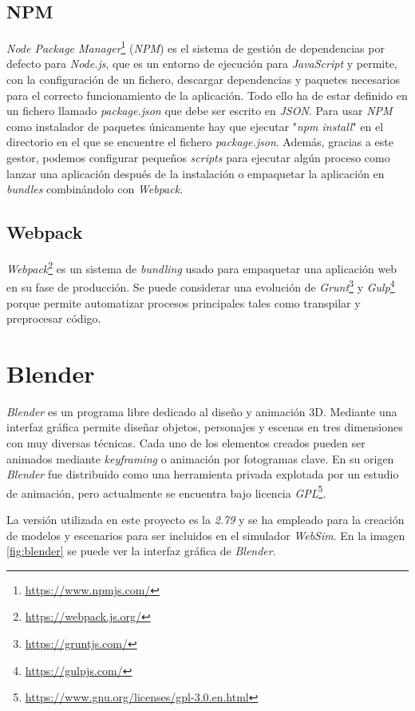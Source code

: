 \subsection{NPM}
\textit{Node Package Manager}\footnote{\url{https://www.npmjs.com/}} (\textit{NPM}) es el sistema de gestión de dependencias por defecto para \textit{Node.js}, que es un entorno de ejecución para \textit{JavaScript} y permite, con la configuración de un fichero, descargar dependencias y paquetes necesarios para el correcto funcionamiento de la aplicación. Todo ello ha de estar definido en un fichero llamado \textit{package.json} que debe ser escrito en \textit{JSON}. Para usar \textit{NPM} como instalador de paquetes únicamente hay que ejecutar "\textit{npm install}" en el directorio en el que se encuentre el fichero \textit{package.json}. Además, gracias a este gestor, podemos configurar pequeños \textit{scripts} para ejecutar algún proceso como lanzar una aplicación después de la instalación o empaquetar la aplicación en \textit{bundles} combinándolo con \textit{Webpack}.


\subsection{Webpack}
\textit{Webpack}\footnote{\url{https://webpack.js.org/}} es un sistema de \textit{bundling} usado para empaquetar una aplicación web en su fase de producción. Se puede considerar una evolución de \textit{Grunt}\footnote{\url{https://gruntjs.com/}} y \textit{Gulp}\footnote{\url{https://gulpjs.com/}} porque permite automatizar procesos principales tales como transpilar y preprocesar código. 


\section{Blender}
\label{sec:blender}
\textit{Blender} es un programa libre dedicado al diseño y animación 3D. Mediante una interfaz gráfica permite diseñar objetos, personajes y escenas en tres dimensiones con muy diversas técnicas. Cada uno de los elementos creados pueden ser animados mediante \textit{keyframing} o animación por fotogramas clave. En su origen \textit{Blender} fue distribuido como una herramienta privada explotada por un estudio de animación, pero actualmente se encuentra bajo licencia \textit{GPL}\footnote{\url{https://www.gnu.org/licenses/gpl-3.0.en.html}}. 

La versión utilizada en este proyecto es la \textit{2.79} y se ha empleado para la creación de modelos y escenarios para ser incluidos en el simulador \textit{WebSim}. En la imagen \ref{fig:blender} se puede ver la interfaz gráfica de \textit{Blender}. \\

